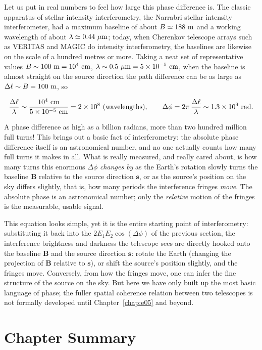 Let us put in real numbers to feel how large this phase difference is. The classic apparatus of stellar intensity interferometry, the Narrabri stellar intensity interferometer, had a maximum baseline of about \(B\simeq188\ {\rm m}\) and a working wavelength of about \(\lambda\simeq0.44\ \mu{\rm m}\); today, when Cherenkov telescope arrays such as VERITAS and MAGIC do intensity interferometry, the baselines are likewise on the scale of a hundred metres or more. Taking a neat set of representative values \(B\sim100\ {\rm m}=10^{4}\ {\rm cm}\), \(\lambda\sim0.5\ \mu{\rm m}=5\times10^{-5}\ {\rm cm}\), when the baseline is almost straight on the source direction the path difference can be as large as \(\Delta\ell\sim B=100\ {\rm m}\), so

\[
  \frac{\Delta\ell}{\lambda}\sim\frac{10^{4}\ {\rm cm}}{5\times10^{-5}\ {\rm cm}}=2\times10^{8}\ (\text{wavelengths}),\qquad
  \Delta\phi=2\pi\,\frac{\Delta\ell}{\lambda}\sim1.3\times10^{9}\ {\rm rad}.
\]

A phase difference as high as a billion radians, more than two hundred million full turns! This brings out a basic fact of interferometry: the absolute phase difference itself is an astronomical number, and no one actually counts how many full turns it makes in all. What is really measured, and really cared about, is how many turns this enormous \(\Delta\phi\) \emph{changes by} as the Earth's rotation slowly turns the baseline \(\bm B\) relative to the source direction \(\bm s\), or as the source's position on the sky differs slightly, that is, how many periods the interference fringes \emph{move}. The absolute phase is an astronomical number; only the \emph{relative} motion of the fringes is the measurable, usable signal.

This equation looks simple, yet it is the entire starting point of interferometry: substituting it back into the \(2E_1E_2\cos(\Delta\phi)\) of the previous section, the interference brightness and darkness the telescope sees are directly hooked onto the baseline \(\bm B\) and the source direction \(\bm s\): rotate the Earth (changing the projection of \(\bm B\) relative to \(\bm s\)), or shift the source's position slightly, and the fringes move. Conversely, from how the fringes move, one can infer the fine structure of the source on the sky. But here we have only built up the most basic language of phase; the fuller spatial coherence relation between two telescopes is not formally developed until Chapter~\ref{chap:e05} and beyond.

\section{Chapter Summary}
\label{sec:e01-summary}

